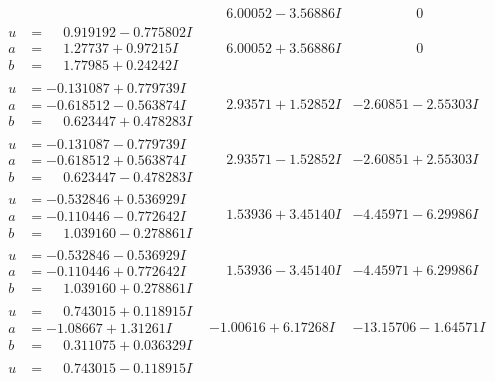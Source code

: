 \documentclass[1p]{elsarticle_modified}
\theoremstyle{definition}
\begin{document}
$$\begin{array}{c|c|c}
 & \phantom{-}6.00052 - 3.56886 I & \phantom{-0.000000 } 0 \\ \hline\begin{aligned}
u &= \phantom{-}0.919192 - 0.775802 I \\
a &= \phantom{-}1.27737 + 0.97215 I \\
b &= \phantom{-}1.77985 + 0.24242 I\end{aligned}
 & \phantom{-}6.00052 + 3.56886 I & \phantom{-0.000000 } 0 \\ \hline\begin{aligned}
u &= -0.131087 + 0.779739 I \\
a &= -0.618512 - 0.563874 I \\
b &= \phantom{-}0.623447 + 0.478283 I\end{aligned}
 & \phantom{-}2.93571 + 1.52852 I & -2.60851 - 2.55303 I \\ \hline\begin{aligned}
u &= -0.131087 - 0.779739 I \\
a &= -0.618512 + 0.563874 I \\
b &= \phantom{-}0.623447 - 0.478283 I\end{aligned}
 & \phantom{-}2.93571 - 1.52852 I & -2.60851 + 2.55303 I \\ \hline\begin{aligned}
u &= -0.532846 + 0.536929 I \\
a &= -0.110446 - 0.772642 I \\
b &= \phantom{-}1.039160 - 0.278861 I\end{aligned}
 & \phantom{-}1.53936 + 3.45140 I & -4.45971 - 6.29986 I \\ \hline\begin{aligned}
u &= -0.532846 - 0.536929 I \\
a &= -0.110446 + 0.772642 I \\
b &= \phantom{-}1.039160 + 0.278861 I\end{aligned}
 & \phantom{-}1.53936 - 3.45140 I & -4.45971 + 6.29986 I \\ \hline\begin{aligned}
u &= \phantom{-}0.743015 + 0.118915 I \\
a &= -1.08667 + 1.31261 I \\
b &= \phantom{-}0.311075 + 0.036329 I\end{aligned}
 & -1.00616 + 6.17268 I & -13.15706 - 1.64571 I \\ \hline\begin{aligned}
u &= \phantom{-}0.743015 - 0.118915 I \\

\end{aligned}
\end{array}$$
\end{document}
